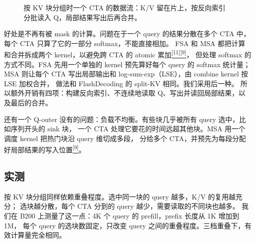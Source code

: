 \begin{figure}[!htbp]
{
}
\setcounter{figure}{6}
\caption{按 KV 块分组时一个 CTA 的数据流：K/V 留在片上，按反向索引分批读入 Q，局部结果写出后再合并。}
\label{fig:kv-kernel}
\end{figure}
\FloatBarrier

好处是不再有被 mask 的计算。问题在于一个 query 的结果分散在多个 CTA 中， 每个 CTA 只算了它的一部分 softmax，不能直接相加。 FSA 和 MSA 都把计算和合并拆成两个 kernel，以避免跨 CTA 的 atomic 累加\hyperlink{ref-11}{\textsuperscript{[11]}}\hyperlink{ref-9}{\textsuperscript{[9]}}， 但处理 softmax 的方式不同。FSA 先用一个单独的 kernel 预先算好每个 query 的 softmax 统计量； MSA 则让每个 CTA 写出局部输出和 log-sum-exp（LSE），由 combine kernel 按 LSE 加权合并， 做法和 FlashDecoding 的 split-KV 相同。我们采用后一种。 所以额外开销有四项：构建反向索引、不连续地读取 Q、写出并读回局部结果，以及最后的合并。

还有一个 Q-outer 没有的问题：负载不均衡。有些块几乎被所有 query 选中，比如序列开头的 sink 块， 一个 CTA 处理它要花的时间远超其他块。MSA 用一个调度 kernel 把热门块沿 query 维切成多段， 分给多个 CTA，并预先为每段分配好局部结果的写入位置\hyperlink{ref-9}{\textsuperscript{[9]}}。

\subsection{实测}

按 KV 块分组同样依赖重叠程度。选中同一块的 query 越多，K/V 的复用越充分； 选块越分散，每个 CTA 分到的 query 越少，需要读取的不同块也越多。 我们在 B200 上测量了这一点：4K 个 query 的 prefill，prefix 长度从 1K 增加到 1M， 每个 query 的选块数固定，只改变 query 之间的重叠程度。三档重叠下，有效计算量完全相同。

